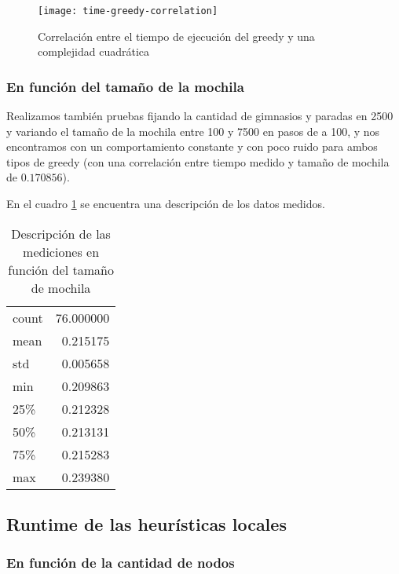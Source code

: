 \begin{figure}[H]
    \centering
    \texttt{[image: time-greedy-correlation]}
    \caption{Correlación entre el tiempo de ejecución del greedy y una complejidad cuadrática}
    \label{fig:time-greedy-correlation}
\end{figure}

\subsubsection{En función del tamaño de la mochila}

Realizamos también pruebas fijando la cantidad de gimnasios y paradas en 2500 y variando el tamaño de la mochila entre 100 y 7500 en pasos de a 100, y nos encontramos con un comportamiento constante y con poco ruido para ambos tipos de greedy (con una correlación entre tiempo medido y tamaño de mochila de $0.170856$).

En el cuadro \ref{tab:time-greedy-moch} se encuentra una descripción de los datos medidos.

\begin{table}[H]
    \begin{center}
        \begin{tabular}{ l | r }
            count  & 76.000000 \\
            mean   &  0.215175 \\
            std    &  0.005658 \\
            min    &  0.209863 \\
            25\%   &  0.212328 \\
            50\%   &  0.213131 \\
            75\%   &  0.215283 \\
            max    &  0.239380 \\
        \end{tabular}
        \caption{Descripción de las mediciones en función del tamaño de mochila}\label{tab:time-greedy-moch}
    \end{center}
\end{table}

\subsection{Runtime de las heurísticas locales}

\subsubsection{En función de la cantidad de nodos}

